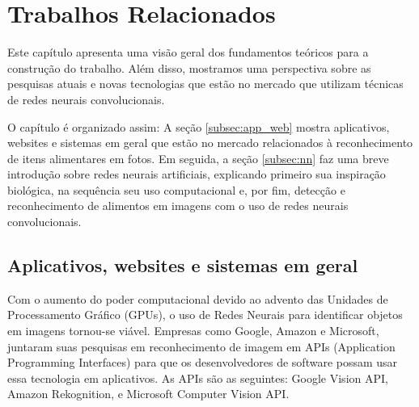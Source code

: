 \section{Trabalhos Relacionados \label{sec:trab_rel}}

Este capítulo apresenta uma visão geral dos fundamentos teóricos para a construção do trabalho. Além disso, mostramos uma perspectiva sobre as pesquisas atuais e novas tecnologias que estão no mercado que utilizam técnicas de redes neurais convolucionais.

O capítulo é organizado assim: A seção \ref{subsec:app_web} mostra aplicativos, websites e sistemas em geral que estão no mercado relacionados à reconhecimento de itens alimentares em fotos. Em seguida, a seção \ref{subsec:nn} faz uma breve introdução sobre redes neurais artificiais, explicando primeiro sua inspiração biológica, na sequência seu uso computacional e, por fim, detecção e reconhecimento de alimentos em imagens com o uso de redes neurais convolucionais.

\subsection{Aplicativos, websites e sistemas em geral \label{subsec:app_web}}

Com o aumento do poder computacional devido ao advento das Unidades de Processamento Gráfico (GPUs), o uso de Redes Neurais para identificar objetos em imagens tornou-se viável. 
Empresas como Google, Amazon e Microsoft, juntaram suas pesquisas em reconhecimento de imagem em APIs (Application Programming Interfaces) para que os desenvolvedores de software possam usar essa tecnologia em aplicativos. As APIs são as seguintes: Google Vision API, Amazon Rekognition, e Microsoft Computer Vision API.

